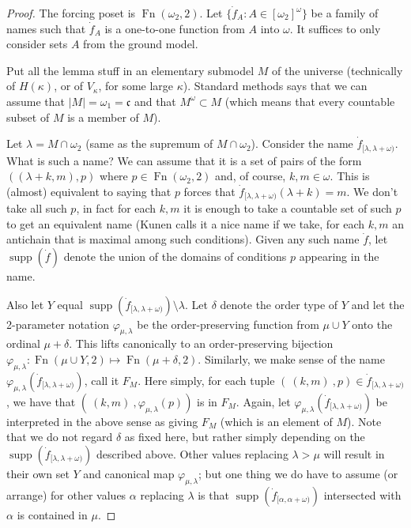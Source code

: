 \documentclass{amsart}
\theoremstyle{plain}
\theoremstyle{definition}
\theoremstyle{remark}
\theoremstyle{plain}
\theoremstyle{definition}
\theoremstyle{remark}
\begin{document}
        \begin{proof}
        The forcing poset is $\operatorname{Fn}(\omega_2, 2)$.
        Let $\{ \dot f_{A} : A\in [\omega_2]^\omega\}$ be a family of
        names such that $\dot f_{A}$ is a one-to-one function from $A$ into
        $\omega$. It suffices to only consider sets $A$ from the ground
        model.
        \bigskip

        Put all the lemma  stuff in an elementary submodel $M$ of the universe
        (technically of $H(\kappa)$,  or of $V_\kappa$,
         for some large $\kappa$). Standard methods says that we can assume that
         $|M|=\omega_1 =\mathfrak c$ and that $M^\omega\subset M$ (which means
         that every countable subset of $M$ is a member of $M$).
        \bigskip

        Let $\lambda = M\cap \omega_2$ (same as the supremum of $M\cap
        \omega_2$). Consider the name  $\dot f_{[\lambda,\lambda+\omega)}$.
        What is such a name?  We can assume that it is a set of pairs
         of the form $( (\lambda+k,m), p)$ where $p\in \mathop{Fn}(\omega_2,
         2)$ and, of course, $k,m\in \omega$. This is (almost) equivalent to
         saying
         that $p$ forces that $\dot f_{[\lambda,\lambda+\omega)}(\lambda+k) =
         m$. We don't take all such $p$, in fact for each $k,m$ it is enough
        to take a
         countable set of such $p$ to get an equivalent name
         (Kunen calls it a nice name if we take, for each $k,m$ an
        antichain that is maximal among such conditions).
        Given any such name $\dot f$, let $\operatorname{supp}(\dot f)$
        denote the union of the domains of conditions $p$ appearing in the
        name.



         Also let $Y$ equal $\operatorname{supp}(\dot
         f_{[\lambda,\lambda+\omega)})\setminus \lambda$.
         Let $\delta$ denote the order type of
         $Y$ and let the 2-parameter notation
         $\varphi_{\mu,\lambda}$ be the order-preserving function from
        $\mu\cup Y$ onto  the ordinal $\mu+\delta$.  This lifts canonically to
        an order-preserving bijection $\varphi_{\mu,\lambda}:
        \operatorname{Fn}(\mu\cup Y,2) \mapsto
        \operatorname{Fn}(\mu+\delta,2)$.
        Similarly, we make sense of the name
         $\varphi_{\mu,\lambda}(\dot f_{[\lambda,\lambda+\omega)})$, call it $F_M$.
        Here simply, for each tuple $(~(k,m)~, p)\in \dot
        f_{[\lambda,\lambda+\omega)}$,
         we have that $(~(k,m)~,\varphi_{\mu,\lambda}(p))$ is in $F_M$.
        Again, let $\varphi_{\mu,\lambda}(\dot f_{[\lambda,\lambda+\omega)})$
        be interpreted in the above sense as giving $F_M$ (which is an element
        of $M$).  Note that we do not regard $\delta$ as fixed here, but
        rather simply depending on the $\operatorname{supp}(\dot
        f_{[\lambda,\lambda+\omega)})$ described above. Other values
        replacing $\lambda>\mu$ will result in their own set $Y$
        and canonical map $\varphi_{\mu,\lambda}$; but one thing we do have to
        assume (or arrange) for other values $\alpha$ replacing $\lambda$
        is that $\operatorname{supp}(\dot f_{[\alpha,\alpha+\omega)})$
        intersected with
        $\alpha$ is contained in $\mu$.


\end{proof}
\end{document}
